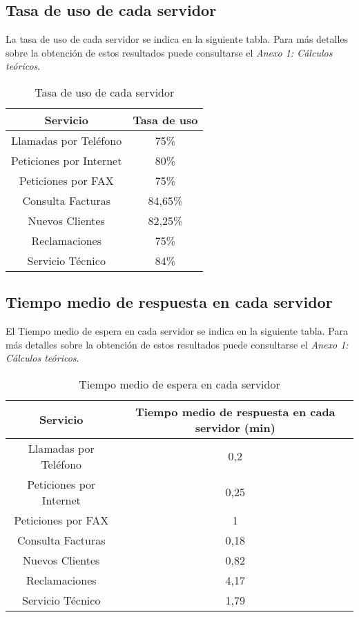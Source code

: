 \subsection{Tasa de uso de cada servidor}
La tasa de uso de cada servidor se indica en la siguiente tabla. Para más detalles sobre la obtención de estos resultados puede consultarse el \textit{Anexo 1: Cálculos teóricos}.\\
\begin{table}[H]
  \begin{center}
  \begin{tabular}{|c|c|}
    \hline
    \textbf{Servicio}       & \textbf{Tasa de uso} \\ \hline
    Llamadas por Teléfono   & 75\%                   \\ \hline
    Peticiones por Internet & 80\%                  \\ \hline
    Peticiones por FAX      & 75\%                   \\ \hline
    Consulta Facturas      & 84,65\%                   \\ \hline
    Nuevos Clientes      & 82,25\%                   \\ \hline
    Reclamaciones      & 75\%                   \\ \hline
    Servicio Técnico      & 84\%                  \\ \hline
  \end{tabular}
\end{center}
  \caption{Tasa de uso de cada servidor}
  \end{table}
\subsection{Tiempo medio de respuesta en cada servidor}
El Tiempo medio de espera en cada servidor se indica en la siguiente tabla. Para más detalles sobre la obtención de estos resultados puede consultarse el \textit{Anexo 1: Cálculos teóricos}.\\
\begin{table}[H]
  \begin{center}
  \begin{tabular}{|c|c|}
    \hline
    \textbf{Servicio}       & \textbf{Tiempo medio de respuesta en cada servidor (min)} \\ \hline
    Llamadas por Teléfono   & 0,2                   \\ \hline
    Peticiones por Internet & 0,25                  \\ \hline
    Peticiones por FAX      & 1                   \\ \hline
    Consulta Facturas      & 0,18                   \\ \hline
    Nuevos Clientes      & 0,82                   \\ \hline
    Reclamaciones      & 4,17                   \\ \hline
    Servicio Técnico      & 1,79                   \\ \hline
  \end{tabular}
\end{center}
  \caption{Tiempo medio de espera en cada servidor}
  \end{table}
